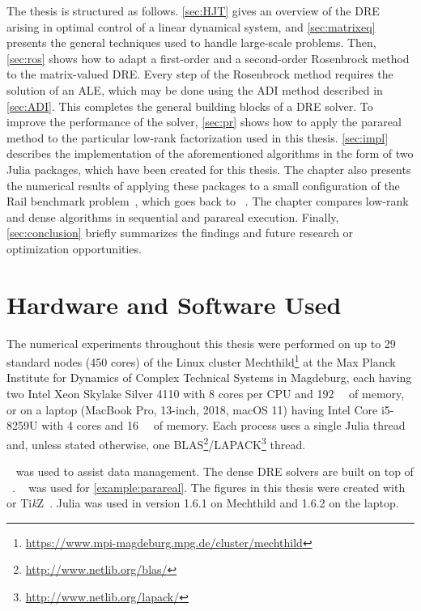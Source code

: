 The thesis is structured as follows.
\autoref{sec:HJT} gives an overview of the \ac{DRE} arising in optimal control of a linear dynamical system,
and \autoref{sec:matrixeq} presents the general techniques used to handle large-scale problems.
Then, \autoref{sec:ros} shows how to adapt a first-order and a second-order Rosenbrock method to the matrix-valued \ac{DRE}.
Every step of the Rosenbrock method requires the solution of an \mbox{\ac{ALE}},
which may be done using \eg the \ac{ADI} method described in \autoref{sec:ADI}.
This completes the general building blocks of a \ac{DRE} solver.
To improve the performance of the solver,
\autoref{sec:pr} shows how to apply the parareal method to the particular low-rank factorization used in this thesis.
\autoref{sec:impl} describes the implementation of the aforementioned algorithms in the form of two Julia packages,
which have been created for this thesis.
The chapter also presents the numerical results of applying these packages to
a small configuration of the Rail benchmark problem~\cite{morwiki_steel},
which goes back to \citeauthor{Benner2005}~\cite{Benner2005}.
The chapter compares low-rank and dense algorithms in sequential and parareal execution.
Finally, \autoref{sec:conclusion} briefly summarizes the findings and future research or optimization opportunities.

\section*{Hardware and Software Used}

The numerical experiments throughout this thesis were performed
on up to 29 standard nodes (450 cores) of the Linux cluster Mechthild\footnote{\url{https://www.mpi-magdeburg.mpg.de/cluster/mechthild}}
at the Max Planck Institute for Dynamics of Complex Technical Systems in Magdeburg,
each having
two Intel Xeon Skylake Silver 4110 with 8 cores per CPU
and \SI{192}{\giga\byte} of memory,
or on a laptop (MacBook Pro, 13-inch, 2018, macOS 11) having
Intel Core i5-8259U with 4 cores and \SI{16}{\giga\byte} of memory.
Each process uses a single Julia thread and,
unless stated otherwise, one BLAS\footnote{%
  \url{http://www.netlib.org/blas/}
}/LAPACK\footnote{%
  \url{http://www.netlib.org/lapack/}
} thread.

~\cite{DrWatson} was used to assist data management.
The dense \ac{DRE} solvers are built on top of ~\cite{MatrixEquations}.
~\cite{DifferentialEquations} was used for \autoref{example:parareal}.
The figures in this thesis were created with
~\cite{Makie} or Ti\emph{k}Z~\cite{TikZ}.
Julia was used in version 1.6.1 on Mechthild and 1.6.2 on the laptop.

